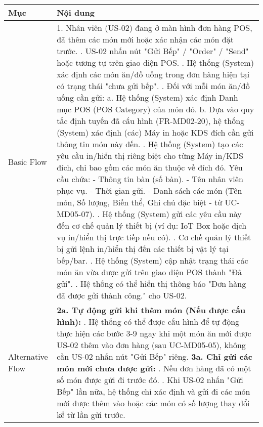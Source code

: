 \begin{longtable}{|m{4cm}|p{11cm}|}
\hline
\textbf{Mục} & \textbf{Nội dung} \\
\hline
Basic Flow & 1. Nhân viên (US-02) đang ở màn hình đơn hàng POS, đã thêm các món mới hoặc xác nhận các món đặt trước. \newline 2. US-02 nhấn nút "Gửi Bếp" / "Order" / "Send" hoặc tương tự trên giao diện POS. \newline 3. Hệ thống (System) xác định các món ăn/đồ uống trong đơn hàng hiện tại có trạng thái "chưa gửi bếp". \newline 4. Đối với mỗi món ăn/đồ uống cần gửi: \newline    a. Hệ thống (System) xác định Danh mục POS (POS Category) của món đó. \newline    b. Dựa vào quy tắc định tuyến đã cấu hình (FR-MD02-20), hệ thống (System) xác định (các) Máy in hoặc KDS đích cần gửi thông tin món này đến. \newline 5. Hệ thống (System) tạo các yêu cầu in/hiển thị riêng biệt cho từng Máy in/KDS đích, chỉ bao gồm các món ăn thuộc về đích đó. Yêu cầu chứa: \newline    - Thông tin bàn (số bàn). \newline    - Tên nhân viên phục vụ. \newline    - Thời gian gửi. \newline    - Danh sách các món (Tên món, Số lượng, Biến thể, Ghi chú đặc biệt - từ UC-MD05-07). \newline 6. Hệ thống (System) gửi các yêu cầu này đến cơ chế quản lý thiết bị (ví dụ: IoT Box hoặc dịch vụ in/hiển thị trực tiếp nếu có). \newline 7. Cơ chế quản lý thiết bị gửi lệnh in/hiển thị đến các thiết bị vật lý tại bếp/bar. \newline 8. Hệ thống (System) cập nhật trạng thái các món ăn vừa được gửi trên giao diện POS thành "Đã gửi". \newline 9. Hệ thống có thể hiển thị thông báo "Đơn hàng đã được gửi thành công." cho US-02. \\
\hline
Alternative Flow & \textbf{2a. Tự động gửi khi thêm món (Nếu được cấu hình):} \newline    1. Hệ thống có thể được cấu hình để tự động thực hiện các bước 3-9 ngay khi một món ăn mới được US-02 thêm vào đơn hàng (sau UC-MD05-05), không cần US-02 nhấn nút "Gửi Bếp" riêng. \newline \textbf{3a. Chỉ gửi các món mới chưa được gửi:} \newline    1. Nếu đơn hàng đã có một số món được gửi đi trước đó. \newline    2. Khi US-02 nhấn "Gửi Bếp" lần nữa, hệ thống chỉ xác định và gửi đi các món mới được thêm vào hoặc các món có số lượng thay đổi kể từ lần gửi trước. \\

\end{longtable}
